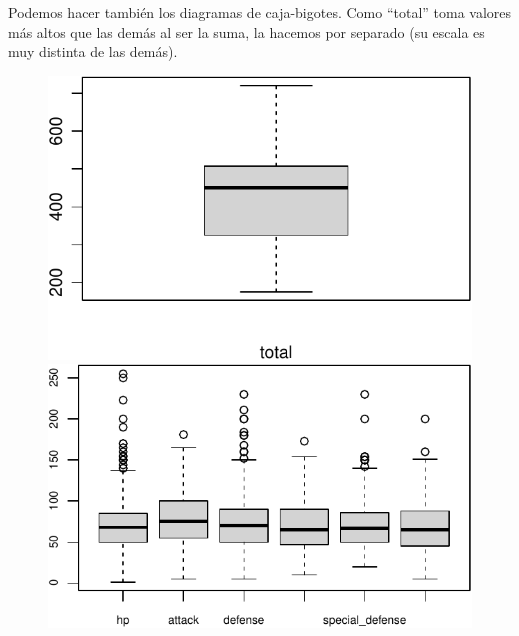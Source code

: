 \documentclass[
  12pt,
]{extreport}
\begin{document}
Podemos hacer también los diagramas de caja-bigotes. Como ``total'' toma
valores más altos que las demás al ser la suma, la hacemos por separado
(su escala es muy distinta de las demás).

\begin{figure}

\begin{minipage}{0.50\linewidth}
\begin{center}
\includegraphics{trabajo_files/figure-pdf/unnamed-chunk-11-1.pdf}
\end{center}
\end{minipage}%
%
\begin{minipage}{0.50\linewidth}
\begin{center}
\includegraphics{trabajo_files/figure-pdf/unnamed-chunk-11-2.pdf}
\end{center}
\end{minipage}%

\end{figure}%
\end{document}
